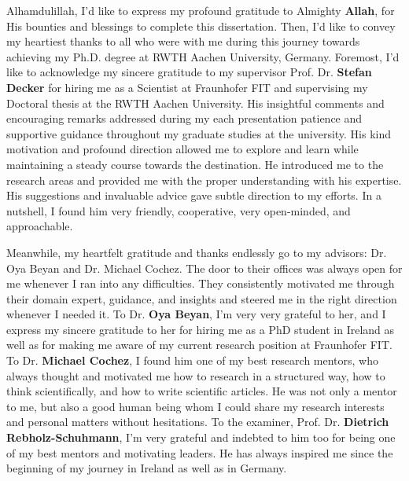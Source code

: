 

\begin{acknowledgements}
    Alhamdulillah, I'd like to express my profound gratitude to Almighty \textbf{Allah}, for His bounties and blessings to complete this dissertation. Then, I'd like to convey my heartiest thanks to all who were with me during this journey towards achieving my Ph.D. degree at RWTH Aachen University, Germany. Foremost, I'd like to acknowledge my sincere gratitude to my supervisor Prof. Dr. \textbf{Stefan Decker} for hiring me as a Scientist at Fraunhofer FIT and supervising my Doctoral thesis at the RWTH Aachen University. His insightful comments and encouraging remarks addressed during my each presentation patience and supportive guidance throughout my graduate studies at the university. His kind motivation and profound direction allowed me to explore and learn while maintaining a steady course towards the destination. He introduced me to the research areas and provided me with the proper understanding with his expertise. His suggestions and invaluable advice gave subtle direction to my efforts. In a nutshell, I found him very friendly, cooperative, very open-minded, and approachable. 
    
    \hspace*{5mm} Meanwhile, my heartfelt gratitude and thanks endlessly go to my advisors: Dr. Oya Beyan and Dr. Michael Cochez. The door to their offices was always open for me whenever I ran into any difficulties. They consistently motivated me through their domain expert, guidance, and insights and steered me in the right direction whenever I needed it. To Dr. \textbf{Oya Beyan}, I'm very very grateful to her, and I express my sincere gratitude to her for hiring me as a PhD student in Ireland as well as for making me aware of my current research position at Fraunhofer FIT. %
    To Dr. \textbf{Michael Cochez}, I found him one of my best research mentors, who always thought and motivated me how to research in a structured way, how to think scientifically, and how to write scientific articles. He was not only a mentor to me, but also a good human being whom I could share my research interests and personal matters without hesitations. To the examiner, Prof. Dr. \textbf{Dietrich Rebholz-Schuhmann}, I'm very grateful and indebted to him too for being one of my best mentors and motivating leaders. He has always inspired me since the beginning of my journey in Ireland as well as in Germany. 
    

\end{acknowledgements}
